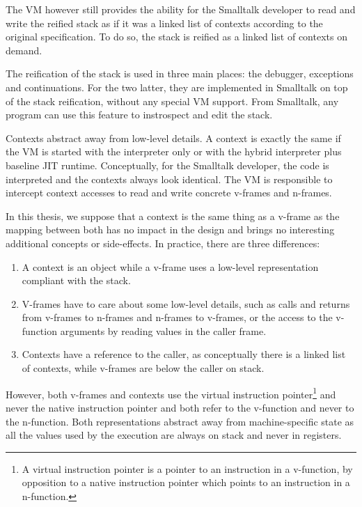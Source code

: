\documentclass[a4paper,12pt,twoside]{../includes/ThesisStyle}
\begin{document}
The VM however still provides the ability for the Smalltalk developer to read and write the reified stack as if it was a linked list of contexts according to the original specification. To do so, the stack is reified as a linked list of contexts on demand. 

The reification of the stack is used in three main places: the debugger, exceptions and continuations. For the two latter, they are implemented in Smalltalk on top of the stack reification, without any special VM support. From Smalltalk, any program can use this feature to instrospect and edit the stack.

Contexts abstract away from low-level details. A context is exactly the same if the VM is started with the interpreter only or with the hybrid interpreter plus baseline JIT runtime. Conceptually, for the Smalltalk developer, the code is interpreted and the contexts always look identical. The VM is responsible to intercept context accesses to read and write concrete v-frames and n-frames.

In this thesis, we suppose that a context is the same thing as a v-frame as the mapping between both has no impact in the design and brings no interesting additional concepts or side-effects. In practice, there are three differences:
\begin{enumerate}
	\item A context is an object while a v-frame uses a low-level representation compliant with the stack.
	\item V-frames have to care about some low-level details, such as calls and returns from v-frames to n-frames and n-frames to v-frames, or the access to the v-function arguments by reading values in the caller frame. 
	\item Contexts have a reference to the caller, as conceptually there is a linked list of contexts, while v-frames are below the caller on stack.
\end{enumerate}
However, both v-frames and contexts use the virtual instruction pointer\footnote{A virtual instruction pointer is a pointer to an instruction in a v-function, by opposition to a native instruction pointer which points to an instruction in a n-function.} and never the native instruction pointer and both refer to the v-function and never to the n-function. Both representations abstract away from machine-specific state as all the values used by the execution are always on stack and never in registers.
\end{document}
